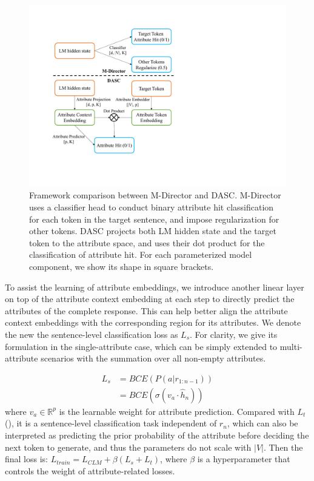 \begin{figure}[t]
    \centering
    \includegraphics[width=1.0\columnwidth]{figures/dasc_illustration.pdf}
    \caption{Framework comparison between M-Director and DASC. M-Director uses a classifier head to conduct binary attribute hit classification for each token in the target sentence, and impose regularization for other tokens. 
DASC projects both LM hidden state and the target token to the attribute space, and uses their dot product for the classification of attribute hit. 
For each parameterized model component, we show its shape in square brackets.}
    \label{fig:dasc_illustration}
\end{figure}

To assist the learning of attribute embeddings, we introduce another linear layer on top of the attribute context embedding at each step to directly predict the attributes of the complete response. This can help better align the attribute 
context embeddings with the corresponding region for its attributes. 
We denote the new the sentence-level classification loss as $L_{s}$. 
For clarity, we give its formulation in the single-attribute case, 
which can be simply extended to multi-attribute scenarios with the 
summation over all non-empty attributes.

\begin{equation}
    \begin{aligned}
        L_{s} &= BCE(P(a | r_{1:n-1})) \\
                  &= BCE(\sigma(v_a \cdot \hat h_n))
    \end{aligned}
\end{equation}
where $v_a \in \mathbb{R}^{p}$ is the learnable weight for attribute prediction. Compared with $L_{t}$ (), it is a sentence-level classification task independent of $r_n$, which can also be interpreted as predicting the prior probability of the attribute before deciding the next token to generate, and thus the parameters do not scale with $|V|$. Then the final loss is: $L_{train} = L_{CLM} + \beta (L_{s} + L_{t})$, where $\beta$ is a hyperparameter that controls the weight of attribute-related losses.

